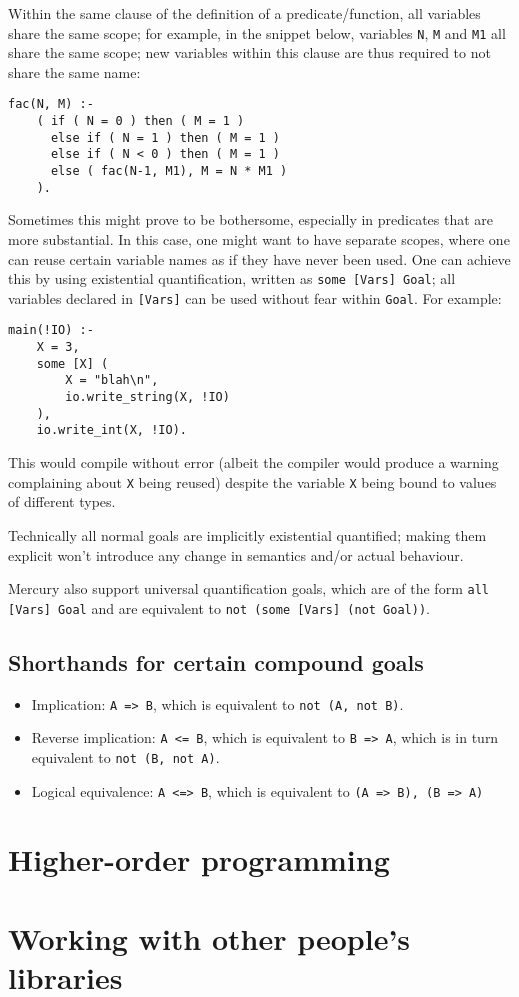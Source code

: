 Within the same clause of the definition of a predicate/function, all variables share the same scope; for example, in the snippet below, variables \texttt{N}, \texttt{M} and \texttt{M1} all share the same scope; new variables within this clause are thus required to not share the same name:

\begin{lstlisting}[language=Mercury]
fac(N, M) :-
	( if ( N = 0 ) then ( M = 1 )
	  else if ( N = 1 ) then ( M = 1 )
	  else if ( N < 0 ) then ( M = 1 )
	  else ( fac(N-1, M1), M = N * M1 )
	).
\end{lstlisting}

Sometimes this might prove to be bothersome, especially in predicates that are more substantial. In this case, one might want to have separate scopes, where one can reuse certain variable names as if they have never been used. One can achieve this by using existential quantification, written as \texttt{some [Vars] Goal}; all variables declared in \texttt{[Vars]} can be used without fear within \texttt{Goal}. For example:

\begin{lstlisting}[language=Mercury]
main(!IO) :-
	X = 3,
	some [X] (
		X = "blah\n",
		io.write_string(X, !IO)
	),
	io.write_int(X, !IO).
\end{lstlisting}

This would compile without error (albeit the compiler would produce a warning complaining about \texttt{X} being reused) despite the variable \texttt{X} being bound to values of different types.

Technically all normal goals are implicitly existential quantified; making them explicit won't introduce any change in semantics and/or actual behaviour.

Mercury also support universal quantification goals, which are of the form \texttt{all [Vars] Goal} and are equivalent to \texttt{not (some [Vars] (not Goal))}.

\subsection{Shorthands for certain compound goals}

\begin{itemize}
\item Implication: \texttt{A => B}, which is equivalent to \texttt{not (A, not B)}.
\item Reverse implication: \texttt{A <= B}, which is equivalent to \texttt{B => A}, which is in turn equivalent to \texttt{not (B, not A)}.
  \item Logical equivalence: \texttt{A <=> B}, which is equivalent to \texttt{(A => B), (B => A)}
\end{itemize}

\section{Higher-order programming}


\section{Working with other people's libraries}


